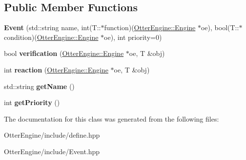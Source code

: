 \subsection*{Public Member Functions}
\begin{DoxyCompactItemize}
\item 
{\bfseries Event} (std\+::string name, int(T\+::$\ast$function)(\hyperlink{class_otter_engine_1_1_engine}{Otter\+Engine\+::\+Engine} $\ast$oe), bool(T\+::$\ast$condition)(\hyperlink{class_otter_engine_1_1_engine}{Otter\+Engine\+::\+Engine} $\ast$oe), int priority=0)\hypertarget{class_otter_engine_1_1_event_ae43f8916bce261ab0e0b2e1d407eb26c}{}\label{class_otter_engine_1_1_event_ae43f8916bce261ab0e0b2e1d407eb26c}

\item 
bool {\bfseries verification} (\hyperlink{class_otter_engine_1_1_engine}{Otter\+Engine\+::\+Engine} $\ast$oe, T \&obj)\hypertarget{class_otter_engine_1_1_event_ae6d8b3ded3f3b6dc86195dfd893442b6}{}\label{class_otter_engine_1_1_event_ae6d8b3ded3f3b6dc86195dfd893442b6}

\item 
int {\bfseries reaction} (\hyperlink{class_otter_engine_1_1_engine}{Otter\+Engine\+::\+Engine} $\ast$oe, T \&obj)\hypertarget{class_otter_engine_1_1_event_acde2169fc2e763a9ee620845f57a0ab3}{}\label{class_otter_engine_1_1_event_acde2169fc2e763a9ee620845f57a0ab3}

\item 
std\+::string {\bfseries get\+Name} ()\hypertarget{class_otter_engine_1_1_event_a6bd69676db5cbb0d52fe362ee56bee68}{}\label{class_otter_engine_1_1_event_a6bd69676db5cbb0d52fe362ee56bee68}

\item 
int {\bfseries get\+Priority} ()\hypertarget{class_otter_engine_1_1_event_a94c4a483738168d48b9ddfe2c2ec66d4}{}\label{class_otter_engine_1_1_event_a94c4a483738168d48b9ddfe2c2ec66d4}

\end{DoxyCompactItemize}


The documentation for this class was generated from the following files\+:\begin{DoxyCompactItemize}
\item 
Otter\+Engine/include/define.\+hpp\item 
Otter\+Engine/include/Event.\+hpp\end{DoxyCompactItemize}
